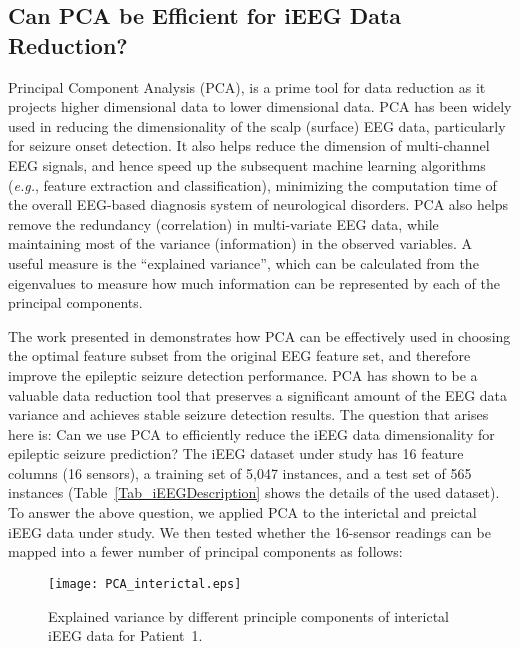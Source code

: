 \documentclass[journal]{IEEEtran}
\begin{document}
\subsection{Can PCA be Efficient for iEEG Data Reduction?}


Principal Component Analysis (PCA), is a prime tool for data reduction as it projects higher dimensional data to lower dimensional data. PCA has been widely used in reducing the dimensionality of the scalp (surface) EEG data, particularly for seizure onset detection. It also helps reduce the dimension of multi-channel EEG signals, and hence speed up the subsequent machine learning algorithms (\textit{e.g.}, feature extraction and classification), minimizing the computation time of the overall EEG-based diagnosis system of neurological disorders. PCA also helps remove the redundancy (correlation) in multi-variate EEG data, while maintaining most of the variance (information) in the observed variables. A useful measure is the ``explained variance'', which can be calculated from the eigenvalues to measure how much information can be represented by each of the principal components.  



The work presented in \cite{wang2017automatic} demonstrates how PCA can be effectively used in choosing the optimal feature subset from the original EEG feature set, and therefore improve the epileptic seizure detection performance. PCA has shown to be a valuable data reduction tool that preserves a significant amount of the EEG data variance and achieves stable seizure detection results. The question that arises here is: Can we use PCA to efficiently reduce the iEEG data dimensionality for epileptic seizure prediction? The iEEG dataset under study has 16 feature columns (16 sensors), a training set of 5,047 instances, and a test set of 565 instances (Table~\ref{Tab_iEEGDescription} shows the details of the used dataset). To answer the above question, we applied PCA to the interictal and preictal iEEG data under study. We then tested whether the 16-sensor readings can be mapped into a fewer number of principal components as follows: 



\begin{figure}[!t]\centering
	\texttt{[image: PCA\_interictal.eps]}
	\caption{Explained variance by different principle components of interictal iEEG data for Patient~1.}
	\label{Fig_PCA_interictal}
\end{figure}
\end{document}
